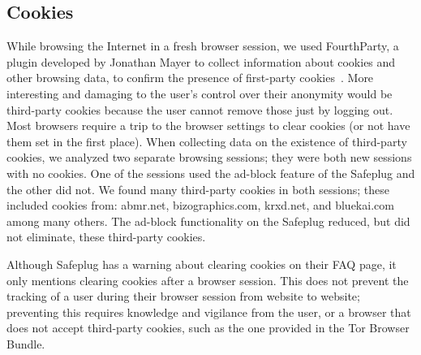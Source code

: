 \documentclass[letterpaper,twocolumn,10pt]{article}
\begin{document}

\subsection{Cookies}  
While browsing the Internet in a fresh browser session, we used FourthParty, a plugin developed by Jonathan Mayer to collect information about cookies and other browsing data, to confirm the presence of first-party cookies~\cite{fourthparty, mayer2012third}.  More interesting and damaging to the user's control over their anonymity would be third-party cookies because the user cannot remove those just by logging out.  Most browsers require a trip to the browser settings to clear cookies (or not have them set in the first place).  When collecting data on the existence of third-party cookies, we analyzed two separate browsing sessions; they were both new sessions with no cookies.  One of the sessions used the ad-block feature of the Safeplug and the other did not.  We found many third-party cookies in both sessions; these included cookies from: abmr.net, bizographics.com, krxd.net, and bluekai.com among many others.  The ad-block functionality on the Safeplug reduced, but did not eliminate, these third-party cookies.

Although Safeplug has a warning about clearing cookies on their FAQ page, it only mentions clearing cookies after a browser session.  This does not prevent the tracking of a user during their browser session from website to website; preventing this requires knowledge and vigilance from the user, or a browser that does not accept third-party cookies, such as the one provided in the Tor Browser Bundle.
\end{document}
